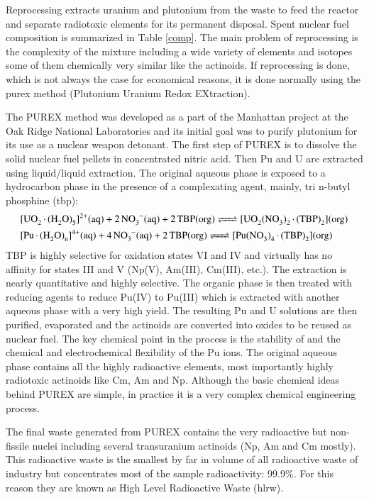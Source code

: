 Reprocessing extracts uranium and plutonium from the waste to feed the reactor and separate 
radiotoxic elements for its permanent disposal. Spent nuclear fuel composition is summarized 
in Table \ref{comp}. The main problem of reprocessing is the complexity of the mixture 
including a wide variety of elements and isotopes some of them chemically very similar like the 
actinoids. 
If reprocessing is done, which is not always the case for economical reasons, it is done 
normally using the \gls{purex} method (Plutonium Uranium Redox 
EXtraction).\cite{NuclearesLozano,HERBST2011141,Katz2007-ch24} 

The PUREX method was developed as a part of the Manhattan project at the Oak Ridge National 
Laboratories and its initial goal was to purify plutonium for its use as a nuclear weapon 
detonant. The first step of PUREX is to dissolve the solid nuclear fuel pellets in 
concentrated nitric acid. Then Pu and U are extracted using liquid/liquid extraction. The 
original aqueous phase is exposed to a hydrocarbon phase in the presence of a complexating 
agent, mainly, tri n-butyl phosphine (\gls{tbp}):
\begin{align*}
&\ce{[UO_2*(H2O)5]^{2+}(aq) + 2NO3^-(aq) + 2TBP(org) <=> [UO_2(NO3)2*(TBP)2](org) }\\
&\ce{[Pu*(H2O)_n]^{4+}(aq) + 4NO3^-(aq) + 2TBP(org) <=> [Pu(NO3)4*(TBP)2](org) }
\end{align*}
TBP is highly selective for oxidation states VI and IV and virtually has no affinity for 
states III and V (Np(V), Am(III), Cm(III), etc.). The extraction is nearly 
quantitative and highly selective. The organic phase is then treated with reducing agents to 
reduce Pu(IV) to Pu(III) which is extracted with another aqueous phase with a very high yield. 
The resulting Pu and U solutions are then purified, evaporated and the actinoids are converted 
into oxides to be reused as nuclear fuel. The key chemical point in the 
process is the stability of  and the chemical and electrochemical flexibility 
of the Pu ions. The original aqueous phase contains all the highly radioactive elements, most 
importantly highly radiotoxic actinoids like Cm, Am and Np.  Although the basic chemical ideas 
behind PUREX are simple, in practice it is a very complex chemical engineering process.

The final waste generated from PUREX contains the very radioactive but non-fissile 
nuclei including several transuranium actinoids (Np, Am and Cm mostly). This radioactive waste is 
the smallest by far in volume of all radioactive waste of industry but concentrates most of 
the sample radioactivity: 99.9\%. For this reason they are known as High Level Radioactive 
Waste 
(\gls{hlrw}).\cite{OECD-NEA-HLRW}

